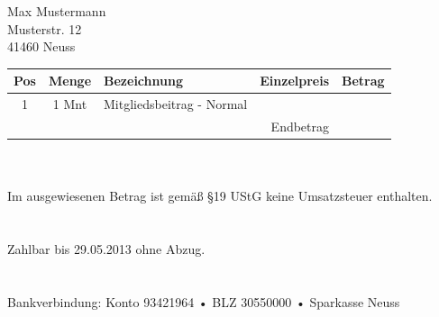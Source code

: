 \documentclass[backaddress=true,fromlogo=true]{scrlttr2}
\newcommand{\fnordname}{Max Mustermann}
\newcommand{\fnordstrasse}{Musterstr. 12}
\newcommand{\fnordort}{41460 Neuss}
\newcommand{\fnordpositionen}{1 & 1 Mnt & Mitgliedsbeitrag - Normal & \EUR{10,00} & \EUR{10,00}\\\hline}
\newcommand{\fnordendbetrag}{\EUR{10,00}}
\newcommand{\fnordzahldatum}{29.05.2013}
\begin{document}
\setlength{\parindent}{0pt}

\begin{letter}{
  \fnordname\\
  \fnordstrasse\\
  \fnordort
}
\opening{}
\renewcommand{\arraystretch}{1.3}
\baselineskip=12pt
\begin{tabular*}{\textwidth}{ccp{}rr}
 \textbf{Pos} & \textbf{Menge} & \textbf{Bezeichnung} & \textbf{Einzelpreis} & \textbf{Betrag} \\
 \hline
 \fnordpositionen
 \multicolumn{4}{r}{\rule{0pt}{4ex}Endbetrag} & \fnordendbetrag\\
\end{tabular*}
\\
\\
{\footnotesize Im ausgewiesenen Betrag ist gemäß §19 UStG keine Umsatzsteuer enthalten.} \\
\\[\baselineskip]
\\
Zahlbar bis {\fnordzahldatum} ohne Abzug. \\
\\
\\
Bankverbindung: Konto 93421964 • BLZ 30550000 • Sparkasse Neuss
\end{letter}
\end{document}

